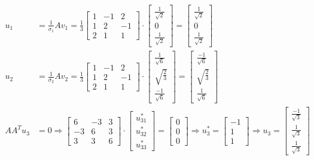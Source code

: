 \documentclass[a4paper, spanish]{article}
\begin{document}
  \begin{align}
    u_1 &=
    \frac{1}{\sigma_1}Av_1 =
    \frac{1}{3}
    \begin{bmatrix}
      1 & -1 & 2\\
      1 & 2 & -1\\
      2 & 1 & 1
    \end{bmatrix}
    \cdot
    \begin{bmatrix}
      \frac{1}{\sqrt{2}} \\
      0 \\
      \frac{1}{\sqrt{2}}
    \end{bmatrix}
    =
    \begin{bmatrix}
      \frac{1}{\sqrt{2}} \\
      0 \\
      \frac{1}{\sqrt{2}}
    \end{bmatrix} \\
    u_2 &=
    \frac{1}{\sigma_2}Av_2 =
    \frac{1}{3}
    \begin{bmatrix}
      1 & -1 & 2\\
      1 & 2 & -1\\
      2 & 1 & 1
    \end{bmatrix}
    \cdot
    \begin{bmatrix}
      \frac{1}{\sqrt{6}} \\
      \sqrt{\frac{2}{3}} \\
      \frac{-1}{\sqrt{6}}
    \end{bmatrix}
    =
    \begin{bmatrix}
      \frac{-1}{\sqrt{6}} \\
      \sqrt{\frac{2}{3}} \\
      \frac{1}{\sqrt{6}}
    \end{bmatrix}\\
    A A^T u_3 &= 0
    \Rightarrow
    \begin{bmatrix}
      6 & -3 & 3 \\
      -3 & 6 & 3 \\
      3 & 3 & 6
    \end{bmatrix}
    \cdot
    \begin{bmatrix}
      u_{31}^* \\
      u_{32}^* \\
      u_{33}^*
    \end{bmatrix}
    =
    \begin{bmatrix}
      0 \\
      0 \\
      0
    \end{bmatrix}
    \Rightarrow
    u_3^* =
    \begin{bmatrix}
      -1 \\
      1 \\
      1
    \end{bmatrix}
    \Rightarrow
    u_3 =
    \begin{bmatrix}
      \frac{-1}{\sqrt{3}} \\
      \frac{1}{\sqrt{3}} \\
      \frac{1}{\sqrt{3}}
    \end{bmatrix}
  \end{align}
\end{document}

